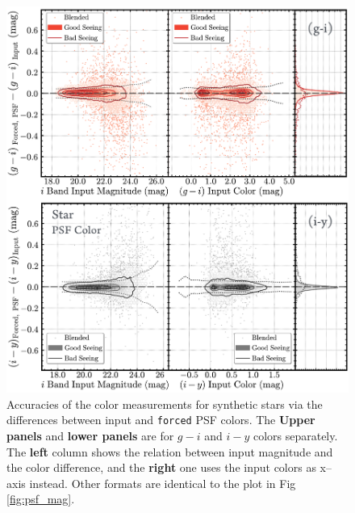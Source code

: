 \documentclass[useamsfonts]{pasj01}
\def\forced{\texttt{forced}}
\begin{document}
\begin{figure}
    \begin{center}
        \includegraphics[width=\textwidth]{fig/synpipe_psf_color}
    \end{center}
    \caption{
        Accuracies of the color measurements for synthetic stars via the differences
        between input and \forced{} PSF colors.
        The \textbf{Upper panels} and \textbf{lower panels} are for $g-i$ and $i-y$
        colors separately.
        The \textbf{left} column shows the relation between input magnitude and
        the color difference, and the \textbf{right} one uses the input colors as
        x--axis instead.
        Other formats are identical to the plot in Fig \ref{fig:psf_mag}.
        }
    \label{fig:psf_color}
\end{figure}
\end{document}
